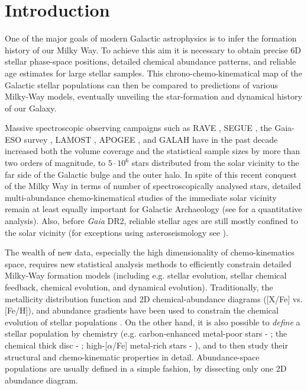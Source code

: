 \documentclass{aa}  %
\begin{document}
   \maketitle


\section{Introduction}

One of the major goals of modern Galactic astrophysics is to infer the formation history of our Milky Way. To achieve this aim it is necessary to obtain precise 6D stellar phase-space positions, detailed chemical abundance patterns, and reliable age estimates for large stellar samples. This chrono-chemo-kinematical map of the Galactic stellar populations can then be compared to predictions of various Milky-Way models, eventually unveiling the star-formation and dynamical history of our Galaxy. 

Massive spectroscopic observing campaigns such as RAVE \citep{Steinmetz2006}, SEGUE \citep{Yanny2009}, the Gaia-ESO survey \citep{Gilmore2012}, LAMOST \citep{Deng2012}, APOGEE \citep{Majewski2017}, and GALAH \citep{Martell2017} have in the past decade increased both the volume coverage and the statistical sample sizes by more than two orders of magnitude, to $5\cdot10^6$ stars distributed from the solar vicinity to the far side of the Galactic bulge and the outer halo. 
In spite of this recent conquest of the Milky Way in terms of number of spectroscopically analysed stars, detailed multi-abundance chemo-kinematical studies of the immediate solar vicinity \citep[e.g.]{Edvardsson1993, Fuhrmann1998, Fuhrmann2011, Fuhrmann2017, Adibekyan2012, Bensby2014, Nissen2015, Nissen2016, DelgadoMena2017} remain at least equally important for Galactic Archaeology (see \citealt{Lindegren2013} for a quantitative analysis). Also, before {\it Gaia} DR2, reliable stellar ages are still mostly confined to the solar vicinity (for exceptions using asteroseismology see \citealt{Chiappini2015, Martig2015, Casagrande2016, Anders2017, Rodrigues2017, Miglio2017}).

The wealth of new data, especially the high dimensionality of chemo-kinematics space, requires new statistical analysis methods to efficiently constrain detailed Milky-Way formation models (including e.g. stellar evolution, stellar chemical feedback, chemical evolution, and dynamical evolution). Traditionally, the metallicity distribution function and 2D chemical-abundance diagrams ([X/Fe] vs. [Fe/H]), and abundance gradients have been used to constrain the chemical evolution of stellar populations \citep[e.g.][]{Pagel2009}. On the other hand, it is also possible to {\it define} a stellar population by chemistry (e.g. carbon-enhanced metal-poor stars - \citealt{Beers2005}; the chemical thick disc - \citealt{Fuhrmann1998}; high-[$\alpha$/Fe] metal-rich stars - \citealt{Adibekyan2011}), and to then study their structural and chemo-kinematic properties in detail. Abundance-space populations are usually defined in a simple fashion, by dissecting only one 2D abundance diagram. 
\end{document}
